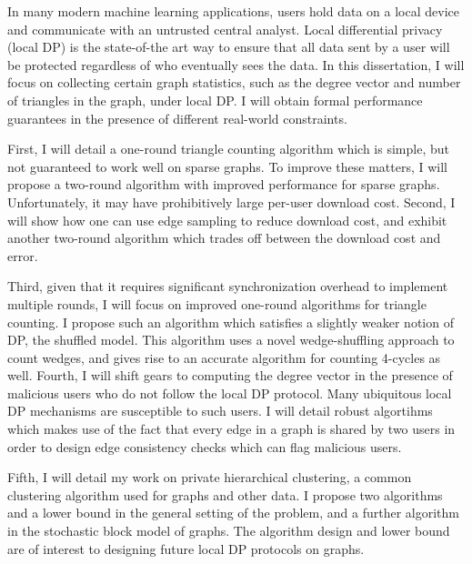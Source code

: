 \documentclass[12pt]{ucsddissertation}
\begin{document}
\begin{dissertationabstract}
In many modern machine learning applications, users hold data on a local device 
and communicate with an untrusted central analyst. Local differential privacy 
(local DP) is the state-of-the art way to ensure that all data sent by a user 
will be protected regardless of who eventually sees the data. In this dissertation,
I will focus on collecting certain graph statistics, such as the degree vector 
and number of triangles in the graph, under local DP. I will 
obtain formal performance guarantees in the presence of different real-world constraints.

First, I will detail a one-round triangle counting algorithm which is simple, but not guaranteed to work 
well on sparse graphs. To improve these matters,
I will propose a two-round algorithm with improved performance 
for sparse graphs. Unfortunately, it may have prohibitively large per-user 
download cost. Second, I will show how one can use 
edge sampling to reduce download cost, and exhibit another two-round algorithm which
trades off between the download cost and error.

Third, given that it requires significant synchronization overhead to implement multiple rounds, I will 
focus on improved one-round algorithms for triangle counting. I propose such an algorithm which satisfies a slightly weaker
notion of DP, the shuffled model. This algorithm uses a novel wedge-shuffling approach
to count wedges, and gives rise to an accurate algorithm for counting 
4-cycles as well. Fourth, I will shift gears to computing the degree vector in the presence
of malicious users who do not follow the local DP protocol. Many ubiquitous local DP mechanisms are susceptible to such users.
 I will detail robust algortihms which
makes use of the fact that every edge in a graph is shared by two users in order to design 
edge consistency checks which can flag malicious users.

Fifth, I will detail my work on private hierarchical clustering,
a common clustering algorithm used for graphs and other data. I propose two algorithms and 
a lower bound in the general setting of the problem, and a further algorithm in the stochastic 
block model of graphs. The algorithm design and lower bound 
are of interest to designing future local DP protocols on graphs.

\end{dissertationabstract}

\mainmatter
\end{document}

